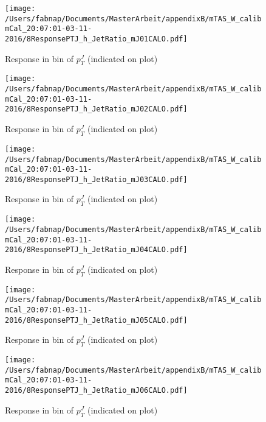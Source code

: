 \begin{figure}

\texttt{[image: /Users/fabnap/Documents/MasterArbeit/appendixB/mTAS\_W\_calibmCal\_20:07:01-03-11-2016/8ResponsePTJ\_h\_JetRatio\_mJ01CALO.pdf]}
\caption{Response in bin of  $p_{T}^{J}$ (indicated on plot)} 

\end{figure}

\begin{figure}

\texttt{[image: /Users/fabnap/Documents/MasterArbeit/appendixB/mTAS\_W\_calibmCal\_20:07:01-03-11-2016/8ResponsePTJ\_h\_JetRatio\_mJ02CALO.pdf]}
\caption{Response in bin of  $p_{T}^{J}$ (indicated on plot)} 

\end{figure}

\begin{figure}

\texttt{[image: /Users/fabnap/Documents/MasterArbeit/appendixB/mTAS\_W\_calibmCal\_20:07:01-03-11-2016/8ResponsePTJ\_h\_JetRatio\_mJ03CALO.pdf]}
\caption{Response in bin of  $p_{T}^{J}$ (indicated on plot)} 

\end{figure}

\begin{figure}

\texttt{[image: /Users/fabnap/Documents/MasterArbeit/appendixB/mTAS\_W\_calibmCal\_20:07:01-03-11-2016/8ResponsePTJ\_h\_JetRatio\_mJ04CALO.pdf]}
\caption{Response in bin of  $p_{T}^{J}$ (indicated on plot)} 

\end{figure}

\begin{figure}

\texttt{[image: /Users/fabnap/Documents/MasterArbeit/appendixB/mTAS\_W\_calibmCal\_20:07:01-03-11-2016/8ResponsePTJ\_h\_JetRatio\_mJ05CALO.pdf]}
\caption{Response in bin of  $p_{T}^{J}$ (indicated on plot)} 

\end{figure}

\begin{figure}

\texttt{[image: /Users/fabnap/Documents/MasterArbeit/appendixB/mTAS\_W\_calibmCal\_20:07:01-03-11-2016/8ResponsePTJ\_h\_JetRatio\_mJ06CALO.pdf]}
\caption{Response in bin of  $p_{T}^{J}$ (indicated on plot)} 

\end{figure}

